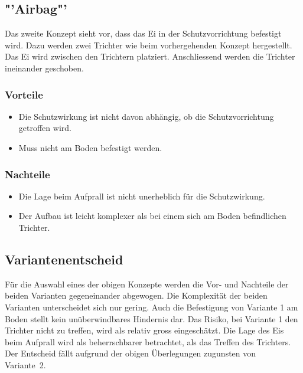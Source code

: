 \documentclass[a4paper,10pt,fleqn]{article}
\begin{document}
\subsection{"'Airbag"'}
Das zweite Konzept sieht vor, dass das Ei in der Schutzvorrichtung befestigt 
wird. Dazu werden zwei Trichter wie beim vorhergehenden Konzept hergestellt. 
Das Ei wird zwischen den Trichtern platziert. Anschliessend werden die 
Trichter ineinander geschoben. 

\subsubsection*{Vorteile}
\begin{itemize}
  \item Die Schutzwirkung ist nicht davon abhängig, ob die Schutzvorrichtung 
        getroffen wird. 
  \item Muss nicht am Boden befestigt werden. 
\end{itemize}

\subsubsection*{Nachteile}
\begin{itemize}
  \item Die Lage beim Aufprall ist nicht unerheblich für die Schutzwirkung. 
  \item Der Aufbau ist leicht komplexer als bei einem sich am Boden 
        befindlichen Trichter. 
\end{itemize}

\subsection{Variantenentscheid}
Für die Auswahl eines der obigen Konzepte werden die Vor- und Nachteile der 
beiden Varianten gegeneinander abgewogen. 
Die Komplexität der beiden Varianten unterscheidet sich nur gering. Auch die 
Befestigung von Variante 1 am Boden stellt kein unüberwindbares Hindernis dar. 
Das Risiko, bei Variante 1 den Trichter nicht zu treffen, wird als relativ 
gross eingeschätzt. Die Lage des Eis beim Aufprall wird als beherrschbarer 
betrachtet, als das Treffen des Trichters. 
Der Entscheid fällt aufgrund der obigen Überlegungen zugunsten von 
\mbox{Variante 2. }
\end{document}
